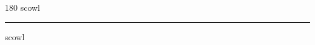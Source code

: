 
\begin{frame}
\begin{center}
\begin{turn}{180}
{\fontsize{2.5cm}{1em}\selectfont scowl}
\end{turn}
\vspace{1em}\par  
\hrule
\vspace{1em}\par  
{\fontsize{2.5cm}{1em}\selectfont scowl}
\end{center}
\end{frame}
